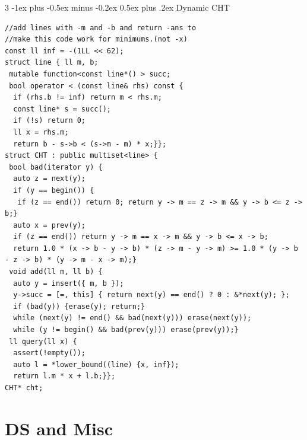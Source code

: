 \documentclass[8pt,a4paper,onesided]{article}
\makeatletter
\renewcommand{\subsection}{\@startsection{subsection}{2}{0mm}
    {-1ex plus -0.5ex minus -0.2ex} %
    {0.5ex plus .2ex}                %
    {\normalfont\large\bfseries}}    %
\makeatother
\begin{document}
\begin{multicols}{3}
\subsection{Dynamic CHT}
\begin{verbatim}
//add lines with -m and -b and return -ans to
//make this code work for minimums.(not -x)
const ll inf = -(1LL << 62);
struct line { ll m, b;
 mutable function<const line*() > succ;
 bool operator < (const line& rhs) const {
  if (rhs.b != inf) return m < rhs.m;
  const line* s = succ();
  if (!s) return 0;
  ll x = rhs.m;
  return b - s->b < (s->m - m) * x;}};
struct CHT : public multiset<line> {
 bool bad(iterator y) {
  auto z = next(y);
  if (y == begin()) {
   if (z == end()) return 0; return y -> m == z -> m && y -> b <= z -> b;}
  auto x = prev(y);
  if (z == end()) return y -> m == x -> m && y -> b <= x -> b;
  return 1.0 * (x -> b - y -> b) * (z -> m - y -> m) >= 1.0 * (y -> b - z -> b) * (y -> m - x -> m);}
 void add(ll m, ll b) {
  auto y = insert({ m, b });
  y->succ = [=, this] { return next(y) == end() ? 0 : &*next(y); };
  if (bad(y)) {erase(y); return;}
  while (next(y) != end() && bad(next(y))) erase(next(y));
  while (y != begin() && bad(prev(y))) erase(prev(y));}
 ll query(ll x) {
  assert(!empty());
  auto l = *lower_bound((line) {x, inf});
  return l.m * x + l.b;}};
CHT* cht;
\end{verbatim}
\section{DS and Misc}

\end{multicols}
\end{document}
